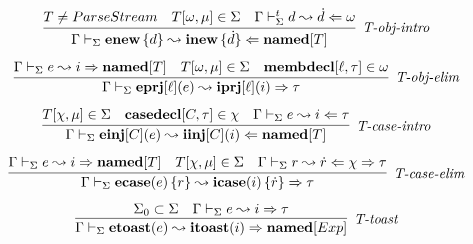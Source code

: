 \begin{figure}
\[\begin{array}{c}
\infer[\textit{T-obj-intro}]
	{\Gamma \vdash_\Sigma \keyw{enew}\,\{ d \}  \leadsto \keyw{inew}\,\{\dot d\} \Leftarrow  \keyw{named}[T]}
	{ T\neq ParseStream & T[\omega, \mu] \in \Sigma & \Gamma \vdash_\Sigma^t d \leadsto \dot d \Leftarrow \omega} \\[2ex]
\infer[\textit{T-obj-elim}]
	{\Gamma \vdash_\Sigma  \keyw{eprj}[\ell](e) \leadsto \keyw{iprj}[\ell](i) \Rightarrow \tau} 
	{\Gamma \vdash_\Sigma e \leadsto i \Rightarrow \keyw{named}[T] & T[\omega, \mu] \in \Sigma & \keyw{membdecl}[\ell, \tau] \in \omega}\\[2ex]
%
%	
	\infer[\textit{T-case-intro}]
	{\Gamma \vdash_\Sigma  \keyw{einj}[C](e) \leadsto \keyw{iinj}[C](i) \Leftarrow \keyw{named}[T]} 
	{T[\chi, \mu] \in \Sigma & \keyw{casedecl}[C, \tau] \in \chi &\Gamma \vdash_\Sigma e \leadsto i \Leftarrow \tau }\\[2ex]

\infer[\textit{T-case-elim}]
	{\Gamma \vdash_\Sigma  \keyw{ecase}(e)\,\{r \}   \leadsto \keyw{icase}(i)\,\{ \dot{r} \} \Rightarrow \tau} 
	{\Gamma \vdash_\Sigma e   \leadsto i \Rightarrow \keyw{named}[T] & T[\chi, \mu] \in \Sigma & \Gamma \vdash_\Sigma r \leadsto \dot{r} \Leftarrow \chi \Rightarrow \tau}\\[2ex]
	

\infer[\textit{T-toast}]
        {\Gamma \vdash_\Sigma \keyw{etoast}(e) \leadsto \keyw{itoast}(i) \Rightarrow \keyw{named}[Exp]}
	{\Sigma_0 \subset \Sigma & \Gamma \vdash_\Sigma e \leadsto i \Rightarrow \tau } \\[2ex]


\end{array}\]
\end{figure}
